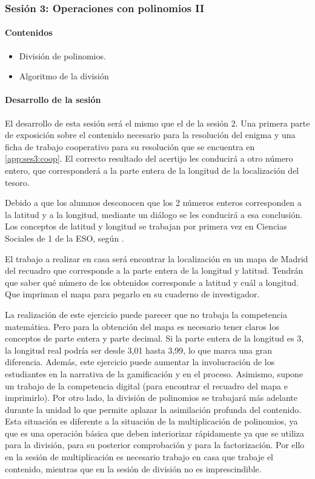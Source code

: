 \subsubsection{Sesión 3: Operaciones con polinomios II}

\paragraph{Contenidos}
\begin{itemize}
	\item División de polinomios.
	\item Algoritmo de la división
\end{itemize}

\paragraph{Desarrollo de la sesión}

El desarrollo de esta sesión será el mismo que el de la sesión 2.
%
Una primera parte de exposición sobre el contenido necesario para la resolución del enigma y una ficha de trabajo cooperativo para su resolución que se encuentra en \ref{app:ses3:coop}.
%
El correcto resultado del acertijo les conducirá a otro número entero, que corresponderá a la parte entera de la longitud de la localización del tesoro.

Debido a que los alumnos desconocen que los 2 números enteros corresponden a la latitud y a la longitud, mediante un diálogo se les conducirá a esa conclusión.
%
Los conceptos de latitud y longitud se trabajan por primera vez en Ciencias Sociales de 1 de la ESO, según \bocm.


El trabajo a realizar en casa será encontrar la localización en un mapa de Madrid del recuadro que corresponde a la parte entera de la longitud y latitud.
%
Tendrán que saber qué número de los obtenidos corresponde a latitud y cuál a longitud.
%
Que impriman el mapa para pegarlo en su cuaderno de investigador.

\Justificacion{}
%
La realización de este ejercicio puede parecer que no trabaja la competencia matemática. 
%
Pero para la obtención del mapa es necesario tener claros los conceptos de parte entera y parte decimal.
%
Si la parte entera de la longitud es 3, la longitud real podría ser desde 3,01 hasta 3,99, lo que marca una gran diferencia.
%
Además, este ejercicio puede aumentar la involucración de los estudiantes en la narrativa de la gamificación y en el proceso.
%
Asimismo, supone un trabajo de la competencia digital (para encontrar el recuadro del mapa e imprimirlo).
%
Por otro lado, la división de polinomios se trabajará más adelante durante la unidad lo que permite aplazar la asimilación profunda del contenido.
%
Esta situación es diferente a la situación de la multiplicación de polinomios, ya que es una operación básica que deben interiorizar rápidamente ya que se utiliza para la división, para su posterior comprobación y para la factorización.
%
Por ello en la sesión de multiplicación es necesario trabajo en casa que trabaje el contenido, mientras que en la sesión de división no es imprescindible.



